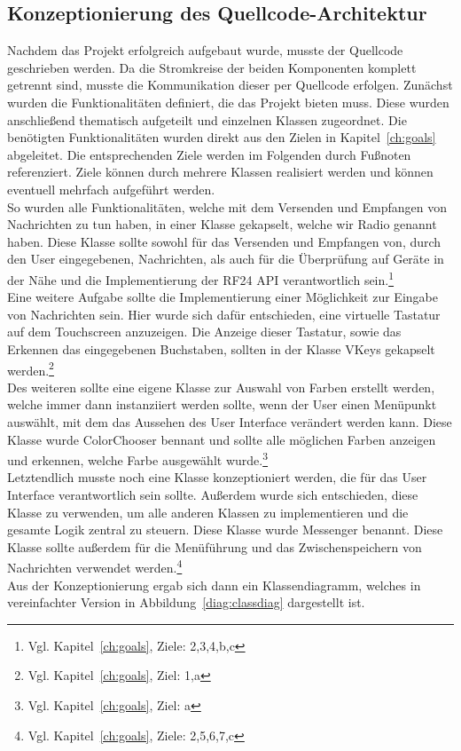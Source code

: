 \documentclass[a4paper, 11pt]{scrartcl}
\begin{document}
\subsection{Konzeptionierung des Quellcode-Architektur}
Nachdem das Projekt erfolgreich aufgebaut wurde, musste der Quellcode geschrieben werden. Da die Stromkreise der beiden Komponenten komplett getrennt sind,
musste die Kommunikation dieser per Quellcode erfolgen.
Zunächst wurden die Funktionalitäten definiert, die das Projekt bieten muss. Diese wurden anschließend thematisch aufgeteilt und einzelnen Klassen zugeordnet.
Die benötigten Funktionalitäten wurden direkt aus den Zielen in Kapitel~\ref{ch:goals} abgeleitet. Die entsprechenden Ziele werden im Folgenden durch Fußnoten
referenziert. Ziele können durch mehrere Klassen realisiert werden und können eventuell mehrfach aufgeführt werden.
\\
So wurden alle Funktionalitäten, welche mit dem Versenden und Empfangen von Nachrichten zu tun haben, in einer Klasse gekapselt, welche wir \glqq Radio\grqq{} genannt haben.
Diese Klasse sollte sowohl für das Versenden und Empfangen von, durch den User eingegebenen, Nachrichten, als auch für die Überprüfung auf Geräte in der Nähe und die
Implementierung der RF24 API verantwortlich sein.\footnote{Vgl. Kapitel~\ref{ch:goals}, Ziele: 2,3,4,b,c}
\\
Eine weitere Aufgabe sollte die Implementierung einer Möglichkeit zur Eingabe von Nachrichten sein. Hier wurde sich dafür entschieden, eine virtuelle Tastatur auf dem
Touchscreen anzuzeigen. Die Anzeige dieser Tastatur, sowie das Erkennen das eingegebenen Buchstaben, sollten in der Klasse \glqq VKeys\grqq{} gekapselt 
werden.\footnote{Vgl. Kapitel~\ref{ch:goals}, Ziel: 1,a}
\\
Des weiteren sollte eine eigene Klasse zur Auswahl von Farben erstellt werden, welche immer dann instanziiert werden sollte, wenn der User einen Menüpunkt auswählt,
mit dem das Aussehen des User Interface verändert werden kann. Diese Klasse wurde \glqq ColorChooser\grqq{} bennant und sollte alle möglichen Farben anzeigen 
und erkennen, welche Farbe ausgewählt wurde.\footnote{Vgl. Kapitel~\ref{ch:goals}, Ziel: a}
\\
Letztendlich musste noch eine Klasse konzeptioniert werden, die für das User Interface verantwortlich sein sollte. Außerdem wurde sich entschieden, diese Klasse
zu verwenden, um alle anderen Klassen zu implementieren und die gesamte Logik zentral zu steuern. Diese Klasse wurde \glqq Messenger\grqq{} benannt. Diese Klasse
sollte außerdem für die Menüführung und das Zwischenspeichern von Nachrichten verwendet werden.\footnote{Vgl. Kapitel~\ref{ch:goals}, Ziele: 2,5,6,7,c}
\\
Aus der Konzeptionierung ergab sich dann ein Klassendiagramm, welches in vereinfachter Version in Abbildung~\ref{diag:classdiag} dargestellt ist.
\end{document}
